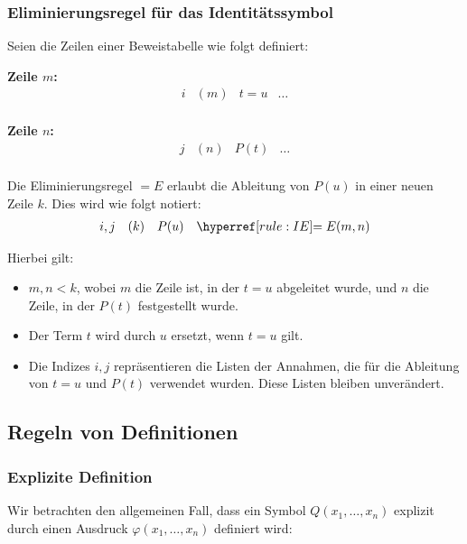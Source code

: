\documentclass[main.tex]{subfiles}
\begin{document}
\subsubsection{Eliminierungsregel für das Identitätssymbol}
\label{rule:IE}
\begin{definition}
Seien die Zeilen einer Beweistabelle wie folgt definiert:

\textbf{Zeile \(m\):}
\[
\begin{array}{llll}
    i & (m) & t = u & \dots \\
\end{array}
\]

\textbf{Zeile \(n\):}
\[
\begin{array}{llll}
    j & (n) & P(t) & \dots \\
\end{array}
\]

Die Eliminierungsregel \(=E\) erlaubt die Ableitung von \(P(u)\) in einer neuen Zeile \(k\). Dies wird wie folgt notiert:
\[
\begin{array}{llll}
    i,j & (k) & P(u) & \rIE{m,n} \\
\end{array}
\]

Hierbei gilt:
\begin{itemize}
    \item \(m, n < k\), wobei \(m\) die Zeile ist, in der \(t = u\) abgeleitet wurde, und \(n\) die Zeile, in der \(P(t)\) festgestellt wurde.
    \item Der Term \(t\) wird durch \(u\) ersetzt, wenn \(t = u\) gilt.
    \item Die Indizes \(i,j\) repräsentieren die Listen der Annahmen, die für die Ableitung von \(t = u\) und \(P(t)\) verwendet wurden. Diese Listen bleiben unverändert.
\end{itemize}
\end{definition}

\subsection{Regeln von Definitionen}

\subsubsection{Explizite Definition}
Wir betrachten den allgemeinen Fall, dass ein Symbol \(Q(x_1,\dots,x_n)\) explizit durch einen Ausdruck \(\varphi(x_1,\dots,x_n)\) definiert wird:
\end{document}
